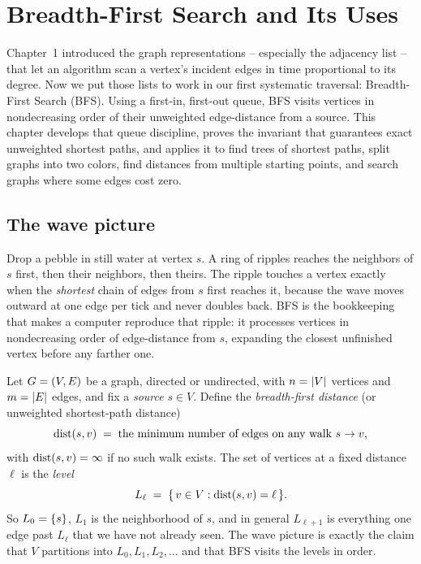 \chapter{Breadth-First Search and Its Uses}

Chapter~1 introduced the graph representations -- especially the adjacency
list -- that let an algorithm scan a vertex's incident edges in time proportional
to its degree. Now we put those lists to work in our first systematic traversal:
Breadth-First Search (BFS). Using a first-in, first-out queue, BFS visits vertices
in nondecreasing order of their unweighted edge-distance from a source. This chapter
develops that queue discipline, proves the invariant that guarantees exact unweighted
shortest paths, and applies it to find trees of shortest paths, split graphs into two colors,
find distances from multiple starting points, and search graphs where some edges cost zero.

\section{The wave picture}
\label{ch02:wave}

\begin{intuitionbox}
Drop a pebble in still water at vertex $s$. A ring of ripples reaches the
neighbors of $s$ first, then their neighbors, then theirs. The ripple touches a
vertex exactly when the \emph{shortest} chain of edges from $s$ first reaches it,
because the wave moves outward at one edge per tick and never doubles back. BFS
is the bookkeeping that makes a computer reproduce that ripple: it processes
vertices in nondecreasing order of edge-distance from $s$, expanding the closest
unfinished vertex before any farther one.
\end{intuitionbox}

Let $G = (V,E)$ be a graph, directed or undirected, with $n = \lvert V\rvert$
vertices and $m = \lvert E\rvert$ edges, and fix a \emph{source} $s \in V$. Define the
\emph{breadth-first distance} (or unweighted shortest-path distance)
\[
  \operatorname{dist}(s,v) \;=\; \text{the minimum number of edges on any walk } s \to v,
\]
with $\operatorname{dist}(s,v) = \infty$ if no such walk exists. The set of vertices at a fixed
distance $\ell$ is the \emph{level}
\[
  L_\ell \;=\; \{\, v \in V : \operatorname{dist}(s,v) = \ell \,\}.
\]
So $L_0 = \{s\}$, $L_1$ is the neighborhood of $s$, and in general $L_{\ell+1}$
is everything one edge past $L_\ell$ that we have not already seen. The wave
picture is exactly the claim that $V$ partitions into $L_0, L_1, L_2, \dots$ and
that BFS visits the levels in order.


